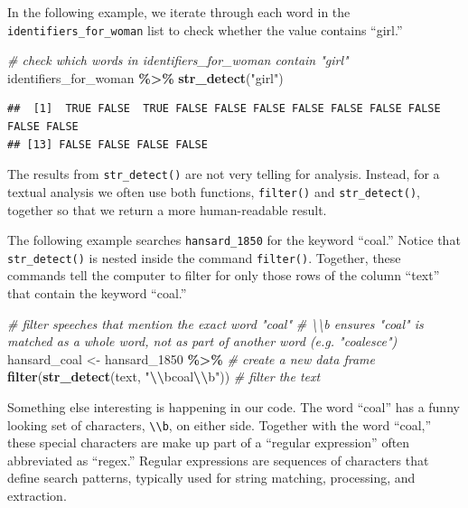 \documentclass[
]{article}
\newenvironment{Shaded}{\begin{snugshade}}{\end{snugshade}}
\newcommand{\CommentTok}[1]{\textcolor[rgb]{0.56,0.35,0.01}{\textit{#1}}}
\newcommand{\FunctionTok}[1]{\textcolor[rgb]{0.13,0.29,0.53}{\textbf{#1}}}
\newcommand{\NormalTok}[1]{#1}
\newcommand{\OtherTok}[1]{\textcolor[rgb]{0.56,0.35,0.01}{#1}}
\newcommand{\SpecialCharTok}[1]{\textcolor[rgb]{0.81,0.36,0.00}{\textbf{#1}}}
\newcommand{\StringTok}[1]{\textcolor[rgb]{0.31,0.60,0.02}{#1}}
\begin{document}
In the following example, we iterate through each word in the
\texttt{identifiers\_for\_woman} list to check whether the value
contains ``girl.''

\begin{Shaded}
\begin{Highlighting}[]
\CommentTok{\# check which words in \textquotesingle{}identifiers\_for\_woman\textquotesingle{} contain "girl"}
\NormalTok{identifiers\_for\_woman }\SpecialCharTok{\%\textgreater{}\%} 
  \FunctionTok{str\_detect}\NormalTok{(}\StringTok{"girl"}\NormalTok{)}
\end{Highlighting}
\end{Shaded}

\begin{verbatim}
##  [1]  TRUE FALSE  TRUE FALSE FALSE FALSE FALSE FALSE FALSE FALSE FALSE FALSE
## [13] FALSE FALSE FALSE FALSE
\end{verbatim}

The results from \texttt{str\_detect()} are not very telling for
analysis. Instead, for a textual analysis we often use both functions,
\texttt{filter()} and \texttt{str\_detect()}, together so that we return
a more human-readable result.

The following example searches \texttt{hansard\_1850} for the keyword
``coal.'' Notice that \texttt{str\_detect()} is nested inside the
command \texttt{filter()}. Together, these commands tell the computer to
filter for only those rows of the column ``text'' that contain the
keyword ``coal.''

\begin{Shaded}
\begin{Highlighting}[]
\CommentTok{\# filter speeches that mention the exact word "coal"}
\CommentTok{\# \textbackslash{}\textbackslash{}b ensures "coal" is matched as a whole word, not as part of another word (e.g. "coalesce")}
\NormalTok{hansard\_coal }\OtherTok{\textless{}{-}}\NormalTok{ hansard\_1850 }\SpecialCharTok{\%\textgreater{}\%} \CommentTok{\# create a new data frame}
  \FunctionTok{filter}\NormalTok{(}\FunctionTok{str\_detect}\NormalTok{(text, }\StringTok{"}\SpecialCharTok{\textbackslash{}\textbackslash{}}\StringTok{bcoal}\SpecialCharTok{\textbackslash{}\textbackslash{}}\StringTok{b"}\NormalTok{)) }\CommentTok{\# filter the text }
\end{Highlighting}
\end{Shaded}

Something else interesting is happening in our code. The word ``coal''
has a funny looking set of characters,
\texttt{\textbackslash{}\textbackslash{}b}, on either side. Together
with the word ``coal,'' these special characters are make up part of a
``regular expression'' often abbreviated as ``regex.'' Regular
expressions are sequences of characters that define search patterns,
typically used for string matching, processing, and extraction.
\end{document}
